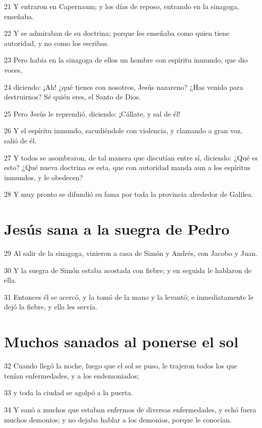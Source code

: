 \par 21 Y entraron en Capernaum; y los días de reposo, entrando en la sinagoga, enseñaba.
\par 22 Y se admiraban de su doctrina; porque les enseñaba como quien tiene autoridad, y no como los escribas.
\par 23 Pero había en la sinagoga de ellos un hombre con espíritu inmundo, que dio voces,
\par 24 diciendo: ¡Ah! ¿qué tienes con nosotros, Jesús nazareno? ¿Has venido para destruirnos? Sé quién eres, el Santo de Dios.
\par 25 Pero Jesús le reprendió, diciendo: ¡Cállate, y sal de él!
\par 26 Y el espíritu inmundo, sacudiéndole con violencia, y clamando a gran voz, salió de él.
\par 27 Y todos se asombraron, de tal manera que discutían entre sí, diciendo: ¿Qué es esto? ¿Qué nueva doctrina es esta, que con autoridad manda aun a los espíritus inmundos, y le obedecen?
\par 28 Y muy pronto se difundió su fama por toda la provincia alrededor de Galilea.

\section*{Jesús sana a la suegra de Pedro}

\par 29 Al salir de la sinagoga, vinieron a casa de Simón y Andrés, con Jacobo y Juan.
\par 30 Y la suegra de Simón estaba acostada con fiebre; y en seguida le hablaron de ella.
\par 31 Entonces él se acercó, y la tomó de la mano y la levantó; e inmediatamente le dejó la fiebre, y ella les servía.

\section*{Muchos sanados al ponerse el sol}

\par 32 Cuando llegó la noche, luego que el sol se puso, le trajeron todos los que tenían enfermedades, y a los endemoniados;
\par 33 y toda la ciudad se agolpó a la puerta.
\par 34 Y sanó a muchos que estaban enfermos de diversas enfermedades, y echó fuera muchos demonios; y no dejaba hablar a los demonios, porque le conocían.

